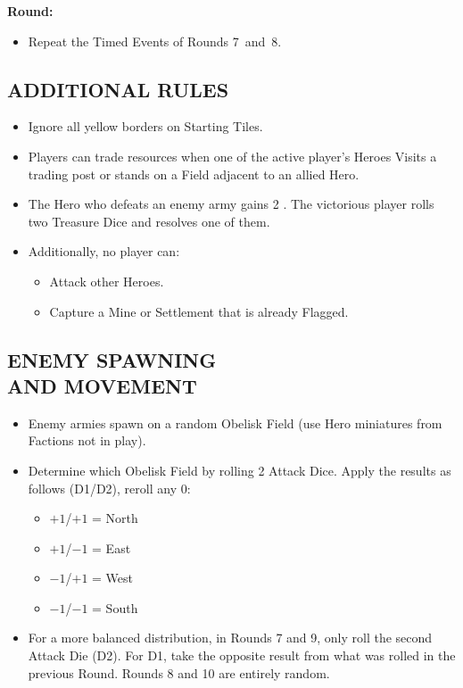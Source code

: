 \begin{multicols}{2}
\textbf{ Round:}
\begin{itemize}
  \item Repeat the Timed Events of Rounds \mbox{7 and 8.}
\end{itemize}

\subsection*{\MakeUppercase{Additional Rules}}

\begin{itemize}
  \item Ignore all yellow borders on Starting Tiles.
  \item Players can trade resources when one of the active player's Heroes Visits a trading post or stands on a Field adjacent to an allied Hero.
  \item The Hero who defeats an enemy army gains 2 .
    The victorious player rolls two Treasure Dice and resolves one of them.
  \item Additionally, no player can:
  \begin{itemize}
      \item Attack other Heroes.
      \item Capture a Mine or Settlement that is already Flagged.
  \end{itemize}
\end{itemize}

\subsection*{\MakeUppercase{Enemy Spawning\\and Movement}}

\begin{itemize}
  \item Enemy armies spawn on a random Obelisk Field (use Hero miniatures from Factions not in play).
  \item Determine which Obelisk Field by rolling 2 Attack Dice. Apply the results as follows (D1/D2), reroll any 0:
  \begin{itemize}
    \item $+1$/$+1$ = North
    \item $+1$/$-1$ = East
    \item $-1$/$+1$ = West
    \item $-1$/$-1$ = South
  \end{itemize}

  \item For a more balanced distribution, in Rounds 7 and 9, only roll the second Attack Die (D2). For D1, take the opposite result from what was rolled in the previous Round.
  Rounds 8 and 10 are entirely random.
  

\end{itemize}
\end{multicols}
